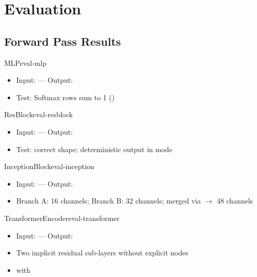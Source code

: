 \documentclass{nngraph-en}
\begin{document}
\chapter{Evaluation}


\section{Forward Pass Results}

\begin{exbox}{MLP}{eval-mlp}
\begin{itemize}[noitemsep]
    \item Input:  --- Output: 
    \item Test: Softmax rows sum to 1 ()
\end{itemize}
\end{exbox}

\begin{exbox}{ResBlock}{eval-resblock}
\begin{itemize}[noitemsep]
    \item Input:  --- Output:
    \item Test: correct shape; deterministic output in  mode
\end{itemize}
\end{exbox}

\begin{exbox}{InceptionBlock}{eval-inception}
\begin{itemize}[noitemsep]
    \item Input:  --- Output:
    \item Branch A: 16 channels; Branch B: 32 channels; merged via
     $\to$ 48 channels
\end{itemize}
\end{exbox}

\begin{exbox}{TransformerEncoder}{eval-transformer}
\begin{itemize}[noitemsep]
    \item Input:  --- Output:
    \item Two implicit residual sub-layers without explicit
     nodes
    \item {} with 
\end{itemize}
\end{exbox}
\end{document}
